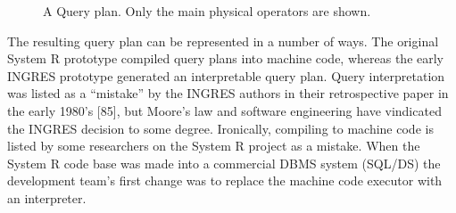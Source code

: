 \documentclass[b5paper,11pt,twoside,openright]{book}
\begin{document}
\begin{figure}
\centering
\centering
{}

\caption{A Query plan. Only the main physical operators are shown.\label{fig-4-1}}
\end{figure}

The resulting query plan can be represented in a number of ways. The
original System R prototype compiled query plans into machine code,
whereas the early INGRES prototype generated an interpretable query
plan. Query interpretation was listed as a ``mistake'' by the INGRES
authors in their retrospective paper in the early 1980's {[}85{]}, but
Moore's law and software engineering have vindicated the INGRES decision
to some degree. Ironically, compiling to machine code is listed by some
researchers on the System R project as a mistake. When the System R code
base was made into a commercial DBMS system
(SQL/DS) the development team's first change was to replace the machine
code executor with an interpreter.
\end{document}
